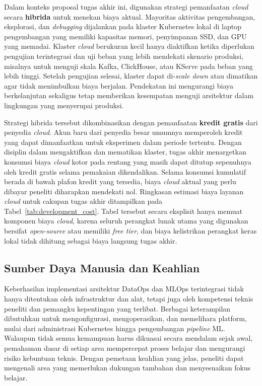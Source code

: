 Dalam konteks proposal tugas akhir ini, digunakan strategi pemanfaatan \textit{cloud} secara \textbf{hibrida} untuk menekan biaya aktual. Mayoritas aktivitas pengembangan, eksplorasi, dan \textit{debugging} dijalankan pada klaster Kubernetes lokal di laptop pengembangan yang memiliki kapasitas memori, penyimpanan SSD, dan GPU yang memadai. Klaster \textit{cloud} berukuran kecil hanya diaktifkan ketika diperlukan pengujian terintegrasi dan uji beban yang lebih mendekati skenario produksi, misalnya untuk menguji skala Kafka, ClickHouse, atau KServe pada beban yang lebih tinggi. Setelah pengujian selesai, klaster dapat di-\textit{scale down} atau dimatikan agar tidak menimbulkan biaya berjalan. Pendekatan ini mengurangi biaya berkelanjutan sekaligus tetap memberikan kesempatan menguji arsitektur dalam lingkungan yang menyerupai produksi.

Strategi hibrida tersebut dikombinasikan dengan pemanfaatan \textbf{kredit gratis} dari penyedia \textit{cloud}. Akun baru dari penyedia besar umumnya memperoleh kredit yang dapat dimanfaatkan untuk eksperimen dalam periode tertentu. Dengan disiplin dalam mengaktifkan dan mematikan klaster, tugas akhir menargetkan konsumsi biaya \textit{cloud} kotor pada rentang yang masih dapat ditutup sepenuhnya oleh kredit gratis selama pemakaian dikendalikan. Selama konsumsi kumulatif berada di bawah plafon kredit yang tersedia, biaya \textit{cloud} aktual yang perlu dibayar peneliti diharapkan mendekati nol. Ringkasan estimasi biaya layanan \textit{cloud} untuk cakupan tugas akhir ditampilkan pada Tabel~\ref{tab:development_cost}. Tabel tersebut secara eksplisit hanya memuat komponen biaya \textit{cloud}, karena seluruh perangkat lunak utama yang digunakan bersifat \textit{open-source} atau memiliki \textit{free tier}, dan biaya kelistrikan perangkat keras lokal tidak dihitung sebagai biaya langsung tugas akhir.



\vspace{-0.5cm}

\subsection{Sumber Daya Manusia dan Keahlian}

Keberhasilan implementasi arsitektur DataOps dan MLOps terintegrasi tidak hanya ditentukan oleh infrastruktur dan alat, tetapi juga oleh kompetensi teknis peneliti dan pemangku kepentingan yang terlibat. Berbagai keterampilan dibutuhkan untuk mengonfigurasi, mengoperasikan, dan memelihara platform, mulai dari administrasi Kubernetes hingga pengembangan \textit{pipeline} ML. Walaupun tidak semua kemampuan harus dikuasai secara mendalam sejak awal, pemahaman dasar di setiap area mempercepat proses belajar dan mengurangi risiko kebuntuan teknis. Dengan pemetaan keahlian yang jelas, peneliti dapat mengenali area yang memerlukan dukungan tambahan dan menyesuaikan fokus belajar.

